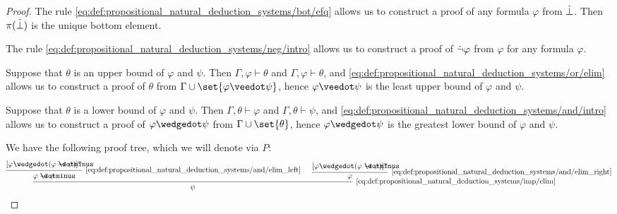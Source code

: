 \begin{proof}
   The rule \ref{eq:def:propositional_natural_deduction_systems/bot/efq} allows us to construct a proof of any formula \( \varphi \) from \( \dot\bot \). Then \( \pi(\dot\bot) \) is the unique bottom element.

   The rule \ref{eq:def:propositional_natural_deduction_systems/neg/intro} allows us to construct a proof of \( \dot\neg \varphi \) from \( \varphi \) for any formula \( \varphi \).

   Suppose that \( \theta \) is an upper bound of \( \varphi \) and \( \psi \). Then \( \Gamma, \varphi \vdash \theta \) and \( \Gamma, \varphi \vdash \theta \), and \ref{eq:def:propositional_natural_deduction_systems/or/elim} allows us to construct a proof of \( \theta \) from \( \Gamma \cup \set{ \varphi \synvee \psi } \), hence \( \varphi \synvee \psi \) is the least upper bound of \( \varphi \) and \( \psi \).

   Suppose that \( \theta \) is a lower bound of \( \varphi \) and \( \psi \). Then \( \Gamma, \theta \vdash \varphi \) and \( \Gamma, \theta \vdash \psi \), and \ref{eq:def:propositional_natural_deduction_systems/and/intro} allows us to construct a proof of \( \varphi \synwedge \psi \) from \( \Gamma \cup \set{ \theta } \), hence \( \varphi \synwedge \psi \) is the greatest lower bound of \( \varphi \) and \( \psi \).



  We have the following proof tree, which we will denote via \( P \):
  \begin{equation*}
    \begin{prooftree}
      \hypo{ [\varphi \synwedge (\varphi \synimplies \psi)]^u }
      \infer1[\ref{eq:def:propositional_natural_deduction_systems/and/elim_left}]{ \varphi \synimplies \psi }

      \hypo{ [\varphi \synwedge (\varphi \synimplies \psi)]^u }
      \infer1[\ref{eq:def:propositional_natural_deduction_systems/and/elim_right}]{ \varphi }

      \infer2[\ref{eq:def:propositional_natural_deduction_systems/imp/elim}]{ \psi }
    \end{prooftree}
  \end{equation*}


\end{proof}
